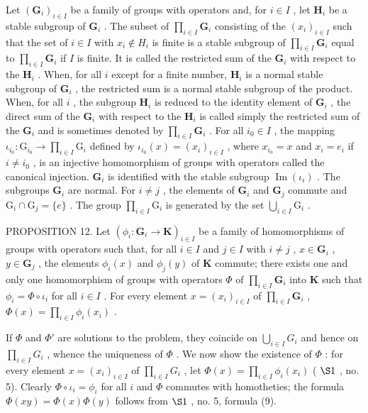 Let \((\mathbf{G}_i)_{i\in I}\) be a family of groups with operators and, for \(i\in I\) , let \(\mathbf{H}_i\) be a stable subgroup of \(\mathbf{G}_i\) . The subset of \(\prod_{i\in I}\mathbf{G}_i\) consisting of the \((x_i)_{i\in I}\) such that the set of \(i\in I\) with \(x_i\notin H_i\) is finite is a stable subgroup of \(\prod_{i\in I}\mathbf{G}_i\) equal to \(\prod_{i\in I}\mathbf{G}_i\) if \(I\) is finite. It is called the restricted sum of the \(\mathbf{G}_i\) with respect to the \(\mathbf{H}_i\) . When, for all \(i\) except for a finite number, \(\mathbf{H}_i\) is a normal stable subgroup of \(\mathbf{G}_i\) , the restricted sum is a normal stable subgroup of the product. When, for all \(i\) , the subgroup \(\mathbf{H}_i\) is reduced to the identity element of \(\mathbf{G}_i\) , the direct sum of the \(\mathbf{G}_i\) with respect to the \(\mathbf{H}_i\) is called simply the restricted sum of the \(\mathbf{G}_i\) and is sometimes denoted by \(\prod_{i\in I}\mathbf{G}_i\) . For all \(i_0\in I\) , the mapping \(\iota_{i_0}:\mathrm{G}_{i_0}\to \prod_{i\in I}\mathrm{G}_i\) defined by \(\iota_{i_0}(x) = (x_i)_{i\in I}\) , where \(x_{i_0} = x\) and \(x_i = e_i\) if \(i\neq i_0\) , is an injective homomorphism of groups with operators called the canonical injection. \(\mathbf{G}_i\) is identified with the stable subgroup \(\operatorname {Im}(\iota_i)\) . The subgroups \(\mathbf{G}_i\) are normal. For \(i\neq j\) , the elements of \(\mathbf{G}_i\) and \(\mathbf{G}_j\) commute and \(\mathrm{G}_i\cap \mathrm{G}_j = \{e\}\) . The group \(\prod_{i\in I}\mathrm{G}_i\) is generated by the set \(\bigcup_{i\in I}\mathrm{G}_i\) .

PROPOSITION 12. Let \((\phi_i: \mathbf{G}_i \to \mathbf{K})_{i \in I}\) be a family of homomorphisms of groups with operators such that, for all \(i \in I\) and \(j \in I\) with \(i \neq j\) , \(x \in \mathbf{G}_i\) , \(y \in \mathbf{G}_j\) , the elements \(\phi_i(x)\) and \(\phi_j(y)\) of \(\mathbf{K}\) commute; there exists one and only one homomorphism of groups with operators \(\Phi\) of \(\prod_{i \in I} \mathbf{G}_i\) into \(\mathbf{K}\) such that \(\phi_i = \Phi \circ \iota_i\) for all \(i \in I\) . For every element \(x = (x_i)_{i \in I}\) of \(\prod_{i \in I} \mathbf{G}_i\) , \(\Phi(x) = \prod_{i \in I} \phi_i(x_i)\) .

If \(\Phi\) and \(\Phi'\) are solutions to the problem, they coincide on \(\bigcup_{i\in I}G_i\) and hence on \(\prod_{i\in I}G_i\) , whence the uniqueness of \(\Phi\) . We now show the existence of \(\Phi\) : for every element \(x = (x_i)_{i\in I}\) of \(\prod_{i\in I}G_i\) , let \(\Phi(x) = \prod_{i\in I}\phi_i(x_i)\) ( \(\S 1\) , no. 5). Clearly \(\Phi \circ \iota_i = \phi_i\) for all \(i\) and \(\Phi\) commutes with homotheties; the formula \(\Phi(xy) = \Phi(x)\Phi(y)\) follows from \(\S 1\) , no. 5, formula (9).

